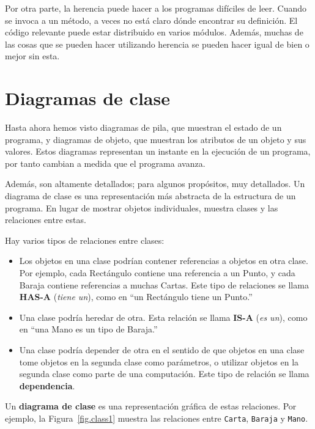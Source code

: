 \documentclass[10pt]{book}
\begin{document}
Por otra parte, la herencia puede hacer a los programas difíciles de leer.
Cuando se invoca a un método, a veces no está claro dónde encontrar su
definición.  El código relevante puede estar distribuido en varios módulos.
Además, muchas de las cosas que se pueden hacer utilizando herencia se pueden
hacer igual de bien o mejor sin esta.


\section{Diagramas de clase}
\label{class.diagram}

Hasta ahora hemos visto diagramas de pila, que muestran el estado de
un programa, y diagramas de objeto, que muestran los atributos
de un objeto y sus valores.  Estos diagramas representan un instante
en la ejecución de un programa, por tanto cambian a medida que el programa
avanza.

Además, son altamente detallados; para algunos propósitos, muy
detallados.  Un diagrama de clase es una representación más abstracta
de la estructura de un programa.  En lugar de mostrar objetos
individuales, muestra clases y las relaciones entre estas.

Hay varios tipos de relaciones entre clases:

\begin{itemize}

\item Los objetos en una clase podrían contener referencias a objetos
en otra clase.  Por ejemplo, cada Rectángulo contiene una referencia
a un Punto, y cada Baraja contiene referencias a muchas Cartas.
Este tipo de relaciones se llama {\bf HAS-A} ({\em tiene un}), como en ``un Rectángulo
tiene un Punto.''

\item Una clase podría heredar de otra.  Esta relación
se llama {\bf IS-A} ({\em es un}), como en ``una Mano es un tipo de Baraja.''

\item Una clase podría depender de otra en el sentido de que objetos
en una clase tome objetos en la segunda clase como parámetros, o
utilizar objetos en la segunda clase como parte de una computación.  Este
tipo de relación se llama {\bf dependencia}.

\end{itemize}

Un {\bf diagrama de clase} es una representación gráfica de estas
relaciones.  Por ejemplo, la Figura~\ref{fig.class1} muestra las
relaciones entre {\tt Carta}, {\tt Baraja} y {\tt Mano}.
\end{document}
